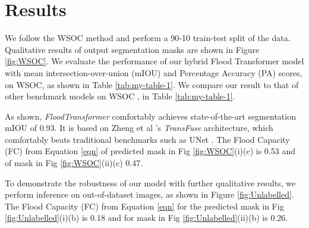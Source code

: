 \documentclass{article}
\begin{document}
\section{Results}

We follow the WSOC method \cite{wsoc} and perform a 90-10 train-test split of the data. Qualitative results of output segmentation masks are shown in Figure \ref{fig:WSOC}. We evaluate the performance of our hybrid Flood Transformer model with mean intersection-over-union (mIOU) and Percentage Accuracy (PA) scores, on WSOC, as shown in Table \ref{tab:my-table-1}. We compare our result to that of other benchmark models on WSOC \cite{wsoc}, in Table \ref{tab:my-table-1}. 

As shown, \textit{FloodTransformer} comfortably achieves state-of-the-art segmentation mIOU of 0.93. It is based on Zheng et al \cite{zhang2021transfuse}'s \textit{TransFuse} architecture, which comfortably beats traditional benchmarks such as UNet \cite{unet}. The Flood Capacity (FC) from Equation \ref{eqn} of predicted mask in Fig \ref{fig:WSOC}(i)(c) is 0.53 and of mask in Fig \ref{fig:WSOC}(ii)(c) 0.47. 

To demonstrate the robustness of our model with further qualitative results, we perform inference on out-of-dataset images, as shown in Figure \ref{fig:Unlabelled}. The Flood Capacity (FC) from Equation \ref{eqn} for the predicted mask in Fig \ref{fig:Unlabelled}(i)(b) is 0.18 and for mask in Fig \ref{fig:Unlabelled}(ii)(b) is 0.26. 
\end{document}
